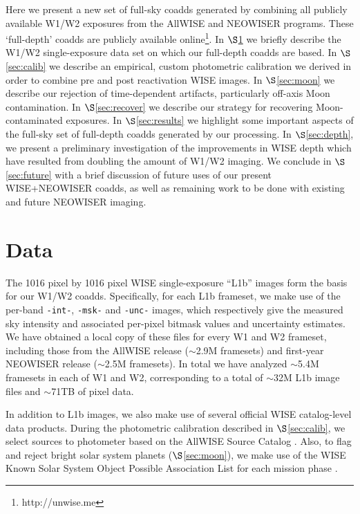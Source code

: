 \documentclass{emulateapj}
\begin{document}
Here we present a new set of full-sky coadds generated by
combining all publicly available W1/W2 exposures from the AllWISE and NEOWISER
programs. These `full-depth' coadds are publicly available 
online\footnote{http://unwise.me}. In $\S$\ref{sec:data} we briefly describe 
the W1/W2 single-exposure data set on which our full-depth coadds are based. 
In $\S$\ref{sec:calib} we describe an empirical, custom photometric calibration
we derived in order to combine pre and post reactivation WISE images. In 
$\S$\ref{sec:moon} we describe our rejection of time-dependent artifacts, 
particularly off-axis Moon contamination. In $\S$\ref{sec:recover} we describe
our strategy for recovering Moon-contaminated exposures. In 
$\S$\ref{sec:results} we highlight some important aspects of the full-sky set 
of full-depth coadds generated by our processing. In $\S$\ref{sec:depth}, we 
present a preliminary investigation of the improvements in WISE depth which 
have resulted from doubling the amount of W1/W2 imaging. We conclude in 
$\S$\ref{sec:future} with a brief discussion of future uses of our present 
WISE+NEOWISER coadds, as well as remaining work to be done with existing and 
future NEOWISER imaging.

\section{Data}
\label{sec:data}

The 1016 pixel by 1016 pixel WISE single-exposure ``L1b'' images form the basis
for our W1/W2 coadds. Specifically, for each L1b frameset, we make use of the 
per-band \verb|-int-|, \verb|-msk-| and \verb|-unc-| images, which respectively
give the measured sky intensity and associated per-pixel bitmask values and 
uncertainty estimates. We have obtained a local copy of these files for every 
W1 and W2 frameset, including those from the AllWISE release ($\sim$2.9M 
framesets) and first-year NEOWISER release ($\sim$2.5M framesets). In
total we have analyzed $\sim$5.4M framesets in each of W1 and W2, corresponding
to a total of $\sim$32M L1b image files and $\sim$71TB of pixel data.

In addition to L1b images, we also make use of several official WISE
catalog-level data products. During the photometric calibration described
in $\S$\ref{sec:calib}, we select sources to photometer based on the AllWISE 
Source Catalog \citep{cutri13}. Also, to flag and reject bright solar system 
planets ($\S$\ref{sec:moon}), we make use of the WISE Known Solar System Object
Possible Association List for each mission phase 
\citep{cutri12, cutri13,cutri15}.
\end{document}
